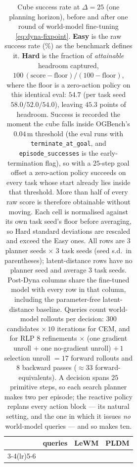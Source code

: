 %
\begin{table}[t]
\centering
\caption{Cube success rate at $\Delta = 25$ (one planning horizon), before and
after one round of world-model fine-tuning \eqref{eq:dyna-fixpoint}.
\textbf{Easy} is the raw success rate (\%) as the benchmark defines it.
\textbf{Hard} is the fraction of \emph{attainable} headroom captured,
$100\,(\text{score}-\text{floor})/(100-\text{floor})$, where the floor is a
zero-action policy on this identical eval: $54.7$ (per task seed
$58.0/52.0/54.0$), leaving $45.3$ points of headroom. Success is recorded the
moment the cube falls inside OGBench's $0.04$\,m threshold (the eval runs with
\texttt{terminate\_at\_goal}, and \texttt{episode\_successes} is the
early-termination flag), so with a $25$-step goal offset a zero-action policy
succeeds on every task whose start already lies inside that threshold. More than
half of every raw score is therefore obtainable without moving.
Each cell is normalised against its own task seed's floor before averaging, so
Hard standard deviations are rescaled and exceed the Easy ones. All rows are $3$
planner seeds $\times$ $3$ task seeds (seed s.d.\ in parentheses); latent-distance
rows have no planner seed and average $3$ task seeds. Post-Dyna columns share the
fine-tuned model with every row in that column, including the parameter-free
latent-distance baseline. Queries count world-model rollouts per decision: $300$
candidates $\times\,10$ iterations for CEM, and for RLP $8$ refinements $\times$
(one gradient unroll $+$ one no-gradient unroll) $+\,1$ selection unroll $=17$
forward rollouts and $8$ backward passes ($\approx\!33$ forward-equivalents). A
decision spans $25$ primitive steps, so each search planner makes two per
episode; the reactive policy replans every action block --- its natural setting,
and the one in which it issues \emph{no} world-model queries --- and so makes ten.}
\label{tab:cube-h25}
\begin{tabular}{lrcccc}
\toprule
& queries & \multicolumn{2}{c}{LeWM} & \multicolumn{2}{c}{PLDM} \\
\cmidrule(lr){3-4}\cmidrule(lr){5-6}

\end{tabular}
\end{table}
